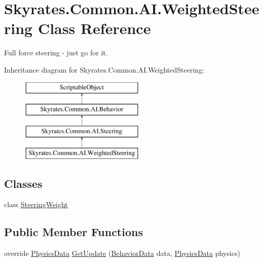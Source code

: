 \hypertarget{class_skyrates_1_1_common_1_1_a_i_1_1_weighted_steering}{\section{Skyrates.\-Common.\-A\-I.\-Weighted\-Steering Class Reference}
\label{class_skyrates_1_1_common_1_1_a_i_1_1_weighted_steering}
}


Full force steering -\/ just go for it.  


Inheritance diagram for Skyrates.\-Common.\-A\-I.\-Weighted\-Steering\-:\begin{figure}[H]
\begin{center}
\leavevmode
\includegraphics[height=4.000000cm]{class_skyrates_1_1_common_1_1_a_i_1_1_weighted_steering}
\end{center}
\end{figure}
\subsection*{Classes}
\begin{DoxyCompactItemize}
\item 
class \hyperlink{class_skyrates_1_1_common_1_1_a_i_1_1_weighted_steering_1_1_steering_weight}{Steering\-Weight}
\end{DoxyCompactItemize}
\subsection*{Public Member Functions}
\begin{DoxyCompactItemize}
\item 
override \hyperlink{class_skyrates_1_1_common_1_1_a_i_1_1_physics_data}{Physics\-Data} \hyperlink{class_skyrates_1_1_common_1_1_a_i_1_1_weighted_steering_a5782d2e6557f0734f0469fe54a8c5704}{Get\-Update} (\hyperlink{class_skyrates_1_1_common_1_1_a_i_1_1_behavior_data}{Behavior\-Data} data, \hyperlink{class_skyrates_1_1_common_1_1_a_i_1_1_physics_data}{Physics\-Data} physics)
\end{DoxyCompactItemize}
